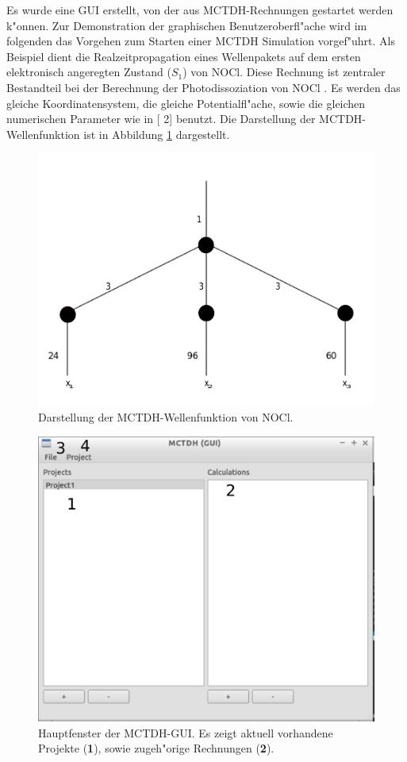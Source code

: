 Es wurde eine GUI erstellt, von der aus MCTDH-Rechnungen gestartet werden k"onnen. 
Zur Demonstration der graphischen Benutzeroberfl"ache wird im folgenden das Vorgehen zum Starten einer 
MCTDH Simulation vorgef"uhrt. Als Beispiel dient die Realzeitpro\-pagation eines Wellenpakets auf dem
ersten elektronisch angeregten Zustand ($S_1$) von NOCl. 
Diese Rechnung ist zentraler Bestandteil bei der Berechnung der Photodissoziation von NOCl \cite{MMC1}.
Es werden das gleiche Koordinatensystem, die gleiche Potentialfl"ache, sowie die gleichen numerischen Parameter wie in
[{\color{darkblue} 2}] benutzt.
Die Darstellung der MCTDH-Wellenfunktion ist in Abbildung \ref{fig:NOCl} dargestellt. 

\begin{figure}
    \centering
    \includegraphics[scale=0.5]{figures/NOCl}
    \caption{Darstellung der MCTDH-Wellenfunktion von NOCl.}\label{fig:NOCl}
\end{figure}

\begin{figure}
    \centering
    \includegraphics[scale=0.5]{figures/screenMain}
    \caption{Hauptfenster der MCTDH-GUI. Es zeigt aktuell vorhandene Projekte (\textbf{1}), sowie zugeh"orige Rechnungen (\textbf{2}).}\label{fig:workflow1}
\end{figure}

